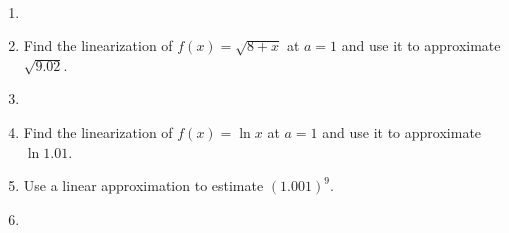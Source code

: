 ~\begin{enumerate}[ref={\fcProblemRef}]
\item  
\item Find the linearization of $f(x)=\sqrt{8+x}$ at $a=1$ and use it to approximate $\sqrt{9.02}$.

\item 
\item Find the linearization of $f(x)=\ln x$ at $a=1$ and use it to approximate $\ln 1.01$.

\item Use a linear approximation to estimate $(1.001)^9$. 

\item 
\end{enumerate}
